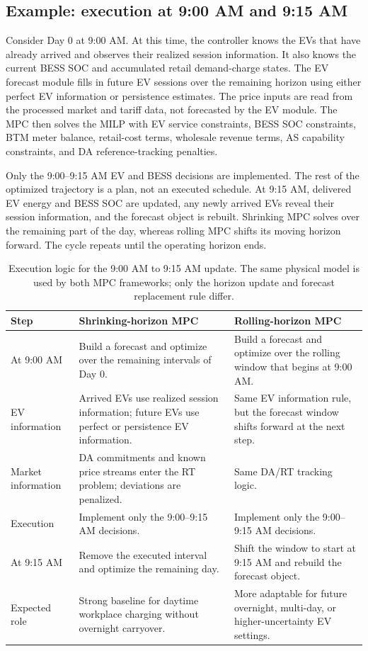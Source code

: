 \documentclass[final,5p,times]{elsarticle}
\begin{document}
\subsection{Example: execution at 9:00 AM and 9:15 AM}
Consider Day 0 at 9:00 AM. At this time, the controller knows the EVs that have already arrived and observes their realized session information. It also knows the current BESS SOC and accumulated retail demand-charge states. The EV forecast module fills in future EV sessions over the remaining horizon using either perfect EV information or persistence estimates. The price inputs are read from the processed market and tariff data, not forecasted by the EV module. The MPC then solves the MILP with EV service constraints, BESS SOC constraints, BTM meter balance, retail-cost terms, wholesale revenue terms, AS capability constraints, and DA reference-tracking penalties.

Only the 9:00--9:15 AM EV and BESS decisions are implemented. The rest of the optimized trajectory is a plan, not an executed schedule. At 9:15 AM, delivered EV energy and BESS SOC are updated, any newly arrived EVs reveal their session information, and the forecast object is rebuilt. Shrinking MPC solves over the remaining part of the day, whereas rolling MPC shifts its moving horizon forward. The cycle repeats until the operating horizon ends.

\begin{table}[!t]
\centering
\caption{Execution logic for the 9:00 AM to 9:15 AM update. The same physical model is used by both MPC frameworks; only the horizon update and forecast replacement rule differ.}
\label{tab:execution_example}
\scriptsize
\begin{tabularx}{\textwidth}{@{}p{}X X@{}}
\toprule
Step & Shrinking-horizon MPC & Rolling-horizon MPC \\
\midrule
At 9:00 AM & Build a forecast and optimize over the remaining intervals of Day 0. & Build a forecast and optimize over the rolling window that begins at 9:00 AM.\\
EV information & Arrived EVs use realized session information; future EVs use perfect or persistence EV information. & Same EV information rule, but the forecast window shifts forward at the next step.\\
Market information & DA commitments and known price streams enter the RT problem; deviations are penalized. & Same DA/RT tracking logic.\\
Execution & Implement only the 9:00--9:15 AM decisions. & Implement only the 9:00--9:15 AM decisions.\\
At 9:15 AM & Remove the executed interval and optimize the remaining day. & Shift the window to start at 9:15 AM and rebuild the forecast object.\\
Expected role & Strong baseline for daytime workplace charging without overnight carryover. & More adaptable for future overnight, multi-day, or higher-uncertainty EV settings.\\
\bottomrule
\end{tabularx}
\end{table}
\end{document}
